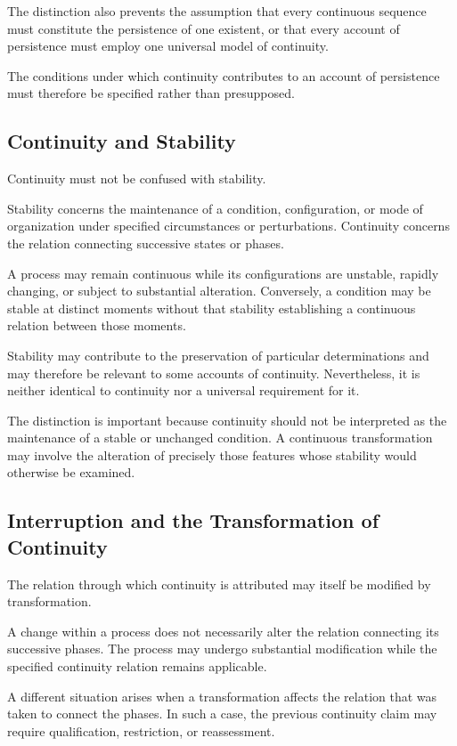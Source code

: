 The distinction also prevents the assumption
that every continuous sequence must constitute
the persistence of one existent, or that every
account of persistence must employ one
universal model of continuity.

The conditions under which continuity
contributes to an account of persistence
must therefore be specified rather than
presupposed.

\subsection{Continuity and Stability}

Continuity must not be confused with stability.

Stability concerns the maintenance of a
condition, configuration, or mode of organization
under specified circumstances or perturbations.
Continuity concerns the relation connecting
successive states or phases.

A process may remain continuous while its
configurations are unstable, rapidly changing,
or subject to substantial alteration. Conversely,
a condition may be stable at distinct moments
without that stability establishing a continuous
relation between those moments.

Stability may contribute to the preservation
of particular determinations and may therefore
be relevant to some accounts of continuity.
Nevertheless, it is neither identical to
continuity nor a universal requirement for it.

The distinction is important because continuity
should not be interpreted as the maintenance
of a stable or unchanged condition. A continuous
transformation may involve the alteration
of precisely those features whose stability
would otherwise be examined.

\subsection{Interruption and the Transformation of Continuity}

The relation through which continuity is
attributed may itself be modified by transformation.

A change within a process does not necessarily
alter the relation connecting its successive
phases. The process may undergo substantial
modification while the specified continuity
relation remains applicable.

A different situation arises when a transformation
affects the relation that was taken to connect
the phases. In such a case, the previous
continuity claim may require qualification,
restriction, or reassessment.

